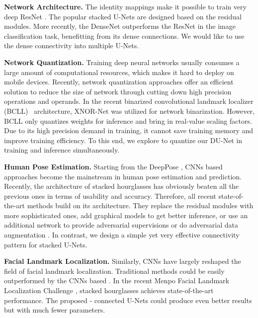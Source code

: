 \documentclass[runningheads]{llncs}
\begin{document}
{\bf Network Architecture.}
The identity mappings make it possible to train very deep ResNet \cite{he2016deep}. The popular stacked U-Nets \cite{newell2016stacked} are designed based on the residual modules. More recently, the DenseNet \cite{huang2016densely} outperforms the ResNet in the image classification task, benefitting from its dense connections. We would like to use the dense connectivity into multiple U-Nets.



{\bf Network Quantization.}
Training deep neural networks usually consumes a large amount of computational resources, which makes it hard to deploy on mobile devices. Recently, network quantization approaches \cite{courbariaux2016binarized,li2016ternary,zhou2016dorefa,wu2018training,rastegari2016xnor} offer an efficient solution to reduce the size of network through cutting down high precision operations and operands. In the recent binarized convolutional landmark localizer (BCLL)~\cite{bulat2017binarized} architecture, XNOR-Net \cite{rastegari2016xnor} was utilized for network binarization. However, BCLL only quantizes weights for inference and bring in real-value scaling factors. Due to its high precision demand in training, it cannot save training memory and improve training efficiency. To this end, we explore to quantize our DU-Net in training and inference simultaneously.

{\bf Human Pose Estimation.}
Starting from the DeepPose \cite{toshev2014deeppose}, CNNs based approaches \cite{wei2016convolutional,carreira2016human,bulat2016human,pishchulin2016deepcut,insafutdinov2016deepercut,lifshitz2016human,belagiannis2017recurrent,zhao2018learning} become the mainstream in human pose estimation and prediction. Recently, the architecture of stacked hourglasses \cite{newell2016stacked} has obviously beaten all the previous ones in terms of usability and accuracy. Therefore, all recent state-of-the-art methods \cite{chu2017multi,yang2017learning,yu2017adversarial,peng2018jointly} build on its architecture. They replace the residual modules with more sophisticated ones, add graphical models to get better inference, or use an additional network to provide adversarial supervisions or do adversarial data augmentation \cite{peng2018jointly}. In contrast, we design a simple yet very effective connectivity pattern for stacked U-Nets.

{\bf Facial Landmark Localization.}
Similarly, CNNs have largely reshaped the field of facial landmark localization. Traditional methods could be easily outperformed by the CNNs based \cite{zhang2014coarse,zhang2014facial,lv2017deep,peng2016recurrent,peng2018red}. In the recent Menpo Facial Landmark Localization Challenge \cite{zafeiriou2017menpo}, stacked hourglasses \cite{newell2016stacked} achieves state-of-the-art performance. The proposed - connected U-Nets could produce even better results but with much fewer parameters.
\end{document}
